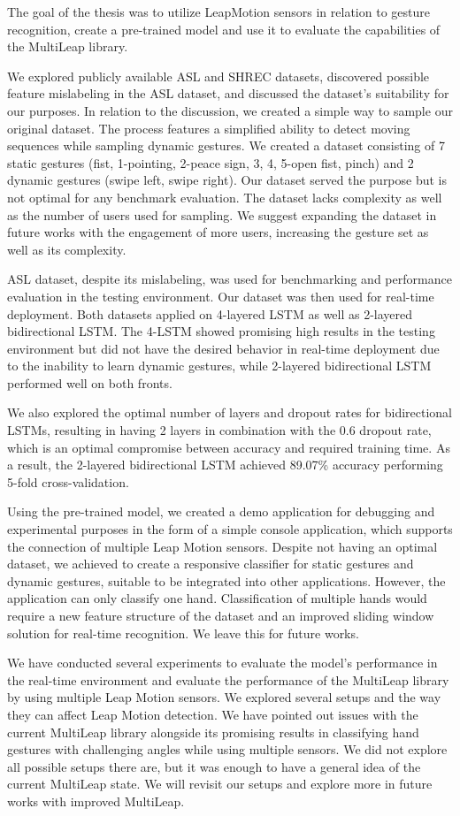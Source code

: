 The goal of the thesis was to utilize LeapMotion sensors in relation to gesture recognition, create a pre-trained model and use it to evaluate the capabilities of the MultiLeap library.

We explored publicly available ASL and SHREC datasets, discovered possible feature mislabeling in the ASL dataset, and discussed the dataset's suitability for our purposes. In relation to the discussion, we created a simple way to sample our original dataset. The process features a simplified ability to detect moving sequences while sampling dynamic gestures. We created a dataset consisting of 7 static gestures (fist, 1-pointing, 2-peace sign, 3, 4, 5-open fist, pinch) and 2 dynamic gestures (swipe left, swipe right). Our dataset served the purpose but is not optimal for any benchmark evaluation. The dataset lacks complexity as well as the number of users used for sampling. We suggest expanding the dataset in future works with the engagement of more users, increasing the gesture set as well as its complexity.

ASL dataset, despite its mislabeling, was used for benchmarking and performance evaluation in the testing environment. Our dataset was then used for real-time deployment. Both datasets applied on 4-layered LSTM as well as 2-layered bidirectional LSTM. The 4-LSTM showed promising high results in the testing environment but did not have the desired behavior in real-time deployment due to the inability to learn dynamic gestures, while 2-layered bidirectional LSTM performed well on both fronts. 

We also explored the optimal number of layers and dropout rates for bidirectional LSTMs, resulting in having 2 layers in combination with the 0.6 dropout rate, which is an optimal compromise between accuracy and required training time. As a result, the 2-layered bidirectional LSTM achieved 89.07\% accuracy performing 5-fold cross-validation.

Using the pre-trained model, we created a demo application for debugging and experimental purposes in the form of a simple console application, which supports the connection of multiple Leap Motion sensors. Despite not having an optimal dataset, we achieved to create a responsive classifier for static gestures and dynamic gestures, suitable to be integrated into other applications. However, the application can only classify one hand. Classification of multiple hands would require a new feature structure of the dataset and an improved sliding window solution for real-time recognition. We leave this for future works.

We have conducted several experiments to evaluate the model's performance in the real-time environment and evaluate the performance of the MultiLeap library by using multiple Leap Motion sensors. We explored several setups and the way they can affect Leap Motion detection. We have pointed out issues with the current MultiLeap library alongside its promising results in classifying hand gestures with challenging angles while using multiple sensors. We did not explore all possible setups there are, but it was enough to have a general idea of the current MultiLeap state. We will revisit our setups and explore more in future works with improved MultiLeap.

